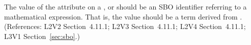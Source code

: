 The value of the  attribute on a \AlgebraicRule, \RateRule or
\AssignmentRule should be an SBO identifier referring to a mathematical
expression.  That is, the value should be a term derived from
\sbomathformula.  (References: L2V2 Section~4.11.1;
L2V3 Section~4.11.1; L2V4 Section~4.11.1; L3V1 Section~\ref{sec:sbo}.)
